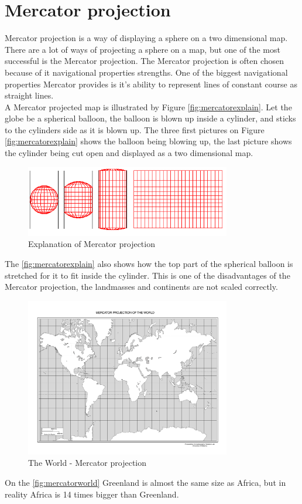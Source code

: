 \section{Mercator projection}
\label{sec:mercatorprojection}
Mercator projection is a way of displaying a sphere on a two dimensional map.
There are a lot of ways of projecting a sphere on a map, but one of the most successful is the Mercator projection. The Mercator projection is often chosen because of it navigational properties strengths. One of the biggest navigational properties Mercator provides is it's ability to represent lines of constant course as straight lines.\\
A Mercator projected map is illustrated by Figure  \autoref{fig:mercatorexplain}. Let the globe be a spherical balloon, the balloon is blown up inside a cylinder, and sticks to the cylinders side as it is blown up. The three first pictures on Figure \autoref{fig:mercatorexplain} shows the balloon being blowing up, the last picture shows the cylinder being cut open and displayed as a two dimensional map.
\begin{figure}[H]
\centering
\includegraphics[width=0.8\textwidth]{img/mercatorexplain.png}
\caption{Explanation of Mercator projection \citep{mercatorexplain}}
\label{fig:mercatorexplain}
\end{figure}
The \autoref{fig:mercatorexplain} also shows how the top part of the spherical balloon is stretched for it to fit inside the cylinder. This is one of the disadvantages of the Mercator projection, the landmasses and continents are not scaled correctly.
\begin{figure}[H]
\centering
\includegraphics[width=0.8\textwidth]{img/mercatorworld.pdf}
\caption{The World - Mercator projection  \citep{mercatorworld}}
\label{fig:mercatorworld}
\end{figure} On the \autoref{fig:mercatorworld} Greenland is almost the same size as Africa, but in reality Africa is 14 times bigger than Greenland.

